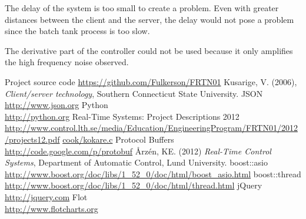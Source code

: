 \documentclass{article}
\begin{document}
The delay of the system is too small to create a problem. Even with greater distances between the client and the server, the delay would not pose a problem since the batch tank process is too slow.

The derivative part of the controller could not be used because it only
amplifies the high frequency noise observed.

\newpage

\begin{thebibliography}{9}
Project source code
\url{https://github.com/Fulkerson/FRTN01}
Kusarige, V. (2006), \emph{Client/server technology}, Southern Connecticut State University.
JSON\\
\url{http://www.json.org}
Python\\
\url{http://python.org}
Real-Time Systems: Project Descriptions 2012\\
\url{http://www.control.lth.se/media/Education/EngineeringProgram/FRTN01/2012/projects12.pdf}
\url{cook/kokare.c}
Protocol Buffers\\
\url{http://code.google.com/p/protobuf}
Årzén, KE. (2012) \emph{Real-Time Control Systems}, Department of
Automatic Control, Lund University.
boost::asio\\
\url{http://www.boost.org/doc/libs/1_52_0/doc/html/boost_asio.html}
boost::thread\\
\url{http://www.boost.org/doc/libs/1_52_0/doc/html/thread.html}
jQuery\\
\url{http://jquery.com}
Flot\\
\url{http://www.flotcharts.org}
\end{thebibliography}
\end{document}
